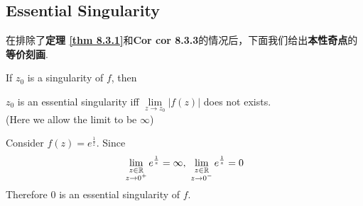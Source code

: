 \vspace{2em}
\subsection{\textbf{Essential Singularity}}
	在排除了\textbf{定理 \ref{thm 8.3.1}}和\textbf{Cor \textbf{cor 8.3.3}}的情况后，下面我们给出\textbf{本性奇点}的\textbf{等价刻画}.
	\begin{corollary}\label{cor 8.3.4}
		If $z_0$ is a singularity of $f$, then
		\begin{center}
			$z_0$ is an essential singularity \hspace*{1em} iff \hspace*{1em} $\underset{z \to z_0}{\lim}{\left| f(z) \right|}$ does not exists. \\
			(Here we allow the limit to be $\infty$)
		\end{center}
	\end{corollary}
	
	\begin{example}\label{ex 8.3.1}
		Consider $f(z) = e^{\frac{1}{z}}$. Since 
		\begin{align}
			\lim_{\substack{z \in \mathbb{R} \\ z \to 0^{+}}}{e^{\frac{1}{z}}} = \infty , \,\, \lim_{\substack{z \in \mathbb{R} \\ z \to 0^{-}}}{e^{\frac{1}{z}}} = 0
		\end{align}
		Therefore $0$ is an essential singularity of $f$.
	\end{example}









\newpage
